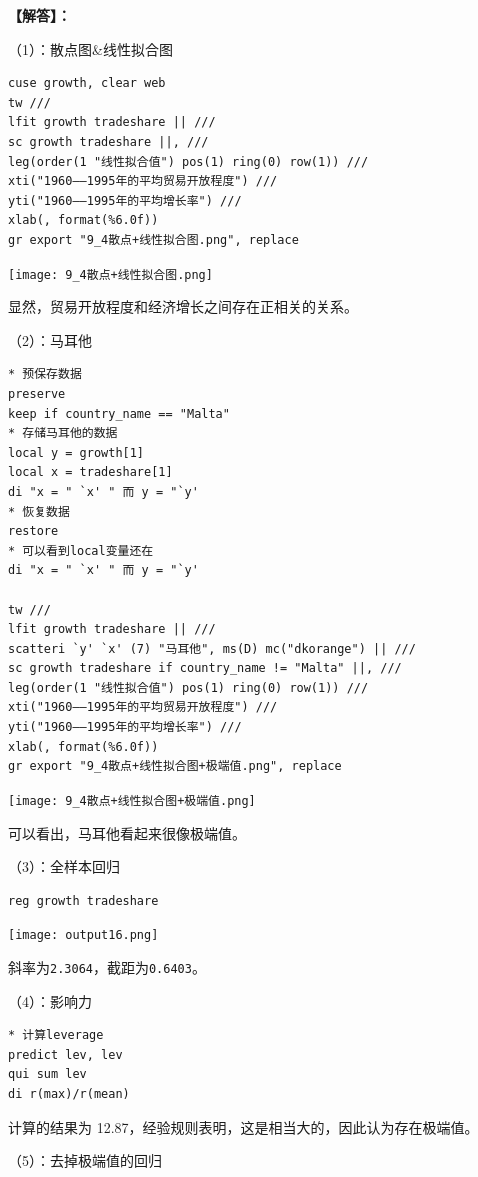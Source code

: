 \documentclass[cn,fancy,blue,11pt]{elegantbook}
\begin{document}
\textbf{【解答】：}

（1）：散点图\&线性拟合图

\begin{lstlisting}
cuse growth, clear web
tw ///
lfit growth tradeshare || ///
sc growth tradeshare ||, ///
leg(order(1 "线性拟合值") pos(1) ring(0) row(1)) ///
xti("1960——1995年的平均贸易开放程度") ///
yti("1960——1995年的平均增长率") ///
xlab(, format(%6.0f))
gr export "9_4散点+线性拟合图.png", replace
\end{lstlisting}

\noindent\texttt{[image: 9\_4散点+线性拟合图.png]}

显然，贸易开放程度和经济增长之间存在正相关的关系。

（2）：马耳他

\begin{lstlisting}
* 预保存数据
preserve
keep if country_name == "Malta"
* 存储马耳他的数据
local y = growth[1]
local x = tradeshare[1]
di "x = " `x' " 而 y = "`y'
* 恢复数据
restore
* 可以看到local变量还在
di "x = " `x' " 而 y = "`y'

tw ///
lfit growth tradeshare || ///
scatteri `y' `x' (7) "马耳他", ms(D) mc("dkorange") || ///
sc growth tradeshare if country_name != "Malta" ||, ///
leg(order(1 "线性拟合值") pos(1) ring(0) row(1)) ///
xti("1960——1995年的平均贸易开放程度") ///
yti("1960——1995年的平均增长率") ///
xlab(, format(%6.0f))
gr export "9_4散点+线性拟合图+极端值.png", replace
\end{lstlisting}

\noindent\texttt{[image: 9\_4散点+线性拟合图+极端值.png]}

可以看出，马耳他看起来很像极端值。

（3）：全样本回归

\begin{lstlisting}
reg growth tradeshare
\end{lstlisting}

\noindent\texttt{[image: output16.png]}

斜率为\lstinline{2.3064}，截距为\lstinline{0.6403}。

（4）：影响力

\begin{lstlisting}
* 计算leverage
predict lev, lev
qui sum lev
di r(max)/r(mean)
\end{lstlisting}

计算的结果为 12.87，经验规则表明，这是相当大的，因此认为存在极端值。

（5）：去掉极端值的回归
\end{document}

